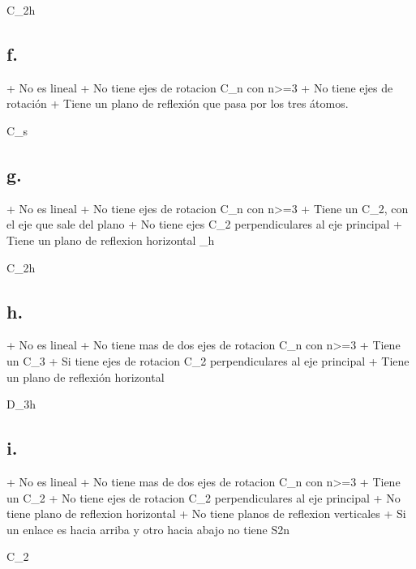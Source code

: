 C_2h


\subsection*{f.}

+ No es lineal
+ No tiene ejes de rotacion C_n con n>=3
+ No tiene ejes de rotación
+ Tiene un plano de reflexión que pasa por los tres átomos.


C_s


\subsection*{g. }

+ No es lineal
+ No tiene ejes de rotacion C_n con n>=3
+ Tiene un C_2, con el eje que sale del plano
+ No tiene ejes C_2 perpendiculares al eje principal
+ Tiene un plano de reflexion horizontal \sigma_h


C_2h



\subsection*{h. }

+ No es lineal
+ No tiene mas de dos ejes de rotacion C_n con n>=3
+ Tiene un C_3
+ Si tiene ejes de rotacion C_2 perpendiculares al eje principal
+ Tiene un plano de reflexión horizontal

D_3h


\subsection*{i. }

+ No es lineal
+ No tiene mas de dos ejes de rotacion C_n con n>=3
+ Tiene un C_2
+ No tiene ejes de rotacion C_2 perpendiculares al eje principal
+ No tiene plano de reflexion horizontal
+ No tiene planos de reflexion verticales
+ Si un enlace es hacia arriba y otro hacia abajo no tiene S2n


C_2



\subsection*{}


